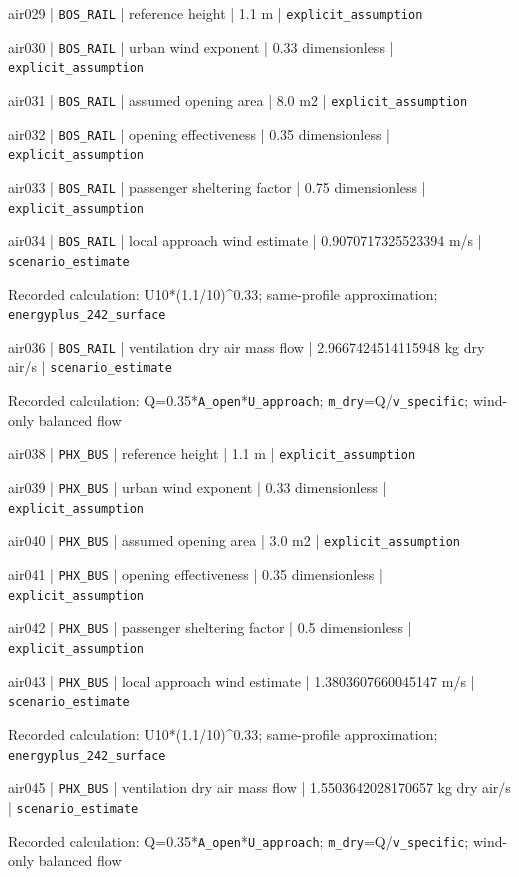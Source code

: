 air029 | \nolinkurl{BOS_RAIL} | reference height | 1.1 m | \nolinkurl{explicit_assumption}

air030 | \nolinkurl{BOS_RAIL} | urban wind exponent | 0.33 dimensionless | \nolinkurl{explicit_assumption}

air031 | \nolinkurl{BOS_RAIL} | assumed opening area | 8.0 m2 | \nolinkurl{explicit_assumption}

air032 | \nolinkurl{BOS_RAIL} | opening effectiveness | 0.35 dimensionless | \nolinkurl{explicit_assumption}

air033 | \nolinkurl{BOS_RAIL} | passenger sheltering factor | 0.75 dimensionless | \nolinkurl{explicit_assumption}

air034 | \nolinkurl{BOS_RAIL} | local approach wind estimate | 0.9070717325523394 m/s | \nolinkurl{scenario_estimate}

Recorded calculation: U10*(1.1/10)\textasciicircum{}0.33; same-profile approximation; \nolinkurl{energyplus_242_surface}

air036 | \nolinkurl{BOS_RAIL} | ventilation dry air mass flow | 2.9667424514115948 kg dry air/s | \nolinkurl{scenario_estimate}

Recorded calculation: Q=0.35*\nolinkurl{A_open}*\nolinkurl{U_approach}; \nolinkurl{m_dry}=Q/\nolinkurl{v_specific}; wind-only balanced flow

air038 | \nolinkurl{PHX_BUS} | reference height | 1.1 m | \nolinkurl{explicit_assumption}

air039 | \nolinkurl{PHX_BUS} | urban wind exponent | 0.33 dimensionless | \nolinkurl{explicit_assumption}

air040 | \nolinkurl{PHX_BUS} | assumed opening area | 3.0 m2 | \nolinkurl{explicit_assumption}

air041 | \nolinkurl{PHX_BUS} | opening effectiveness | 0.35 dimensionless | \nolinkurl{explicit_assumption}

air042 | \nolinkurl{PHX_BUS} | passenger sheltering factor | 0.5 dimensionless | \nolinkurl{explicit_assumption}

air043 | \nolinkurl{PHX_BUS} | local approach wind estimate | 1.3803607660045147 m/s | \nolinkurl{scenario_estimate}

Recorded calculation: U10*(1.1/10)\textasciicircum{}0.33; same-profile approximation; \nolinkurl{energyplus_242_surface}

air045 | \nolinkurl{PHX_BUS} | ventilation dry air mass flow | 1.5503642028170657 kg dry air/s | \nolinkurl{scenario_estimate}

Recorded calculation: Q=0.35*\nolinkurl{A_open}*\nolinkurl{U_approach}; \nolinkurl{m_dry}=Q/\nolinkurl{v_specific}; wind-only balanced flow

